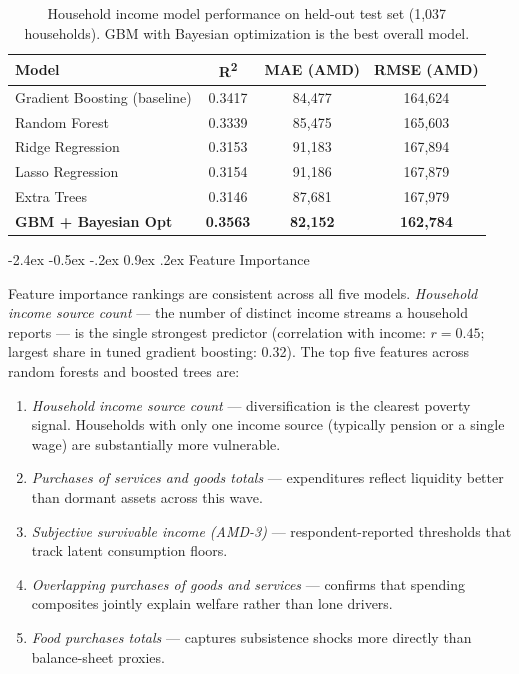 \documentclass[12pt]{article}
\makeatletter
\renewcommand\subsection{%
  \@startsection{subsection}{2}{\z@}%
    {-2.4ex \@plus -0.5ex \@minus -.2ex}%
    {0.9ex \@plus .2ex}%
    {\color{steelblue}\normalsize\bfseries}}
\makeatother
\begin{document}
\begin{table}[H]
\centering
{}
\begin{tabularx}{\textwidth}{lCCC}
\toprule
{}
{\color{navyblue}\textbf{Model}} &
{\color{navyblue}\textbf{R\textsuperscript{2}}} &
{\color{navyblue}\textbf{MAE (AMD)}} &
{\color{navyblue}\textbf{RMSE (AMD)}} \\
\midrule
Gradient Boosting (baseline) & 0.3417 & 84,477  & 164,624 \\
Random Forest                & 0.3339 & 85,475  & 165,603 \\
Ridge Regression             & 0.3153 & 91,183  & 167,894 \\
Lasso Regression             & 0.3154 & 91,186  & 167,879 \\
Extra Trees                  & 0.3146 & 87,681  & 167,979 \\
\midrule
{}
\textbf{GBM + Bayesian Opt}  & \textbf{0.3563} & \textbf{82,152} & \textbf{162,784} \\
\bottomrule
\end{tabularx}
\caption{Household income model performance on held-out test set (1,037 households).
GBM with Bayesian optimization is the best overall model.}
\label{tab:hh-income-models}
\end{table}

\subsection{Feature Importance}

\indent\hspace*{1em}
Feature importance rankings are consistent across all five models.
\textit{Household income source count} --- the number of distinct income
streams a household reports --- is the single strongest predictor (correlation
with income: $r = 0.45$; largest share in tuned gradient boosting: 0.32). The top five features across random forests and boosted trees are:

\begin{enumerate}[leftmargin=*, itemsep=0.3em]
  \item \textit{Household income source count} ---
        diversification is the clearest poverty signal. Households with only
        one income source (typically pension or a single wage) are substantially
        more vulnerable.
  \item \textit{Purchases of services and goods totals} ---
        expenditures reflect liquidity better than dormant assets across this wave.
  \item \textit{Subjective survivable income (AMD-3)} ---
        respondent-reported thresholds that track latent consumption floors.
  \item \textit{Overlapping purchases of goods and services} ---
        confirms that spending composites jointly explain welfare rather than lone drivers.
  \item \textit{Food purchases totals} ---
        captures subsistence shocks more directly than balance-sheet proxies.
\end{enumerate}
\end{document}
